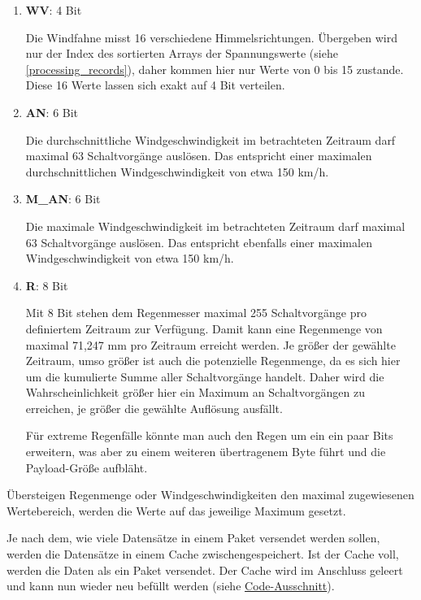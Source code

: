 \documentclass[12pt]{article}
\begin{document}
      \begin{enumerate}
        \item \textbf{WV}: 4 Bit
        
        Die Windfahne misst 16 verschiedene Himmelsrichtungen.
        Übergeben wird nur der Index des sortierten Arrays der Spannungswerte (siehe \underline{\ref{processing_records}}), daher kommen hier nur Werte von 0 bis 15 zustande.
        Diese 16 Werte lassen sich exakt auf 4 Bit verteilen.

        \item \textbf{AN}: 6 Bit
        
        Die durchschnittliche Windgeschwindigkeit im betrachteten Zeitraum darf maximal 63 Schaltvorgänge auslösen.
        Das entspricht einer maximalen durchschnittlichen Windgeschwindigkeit von etwa 150 km/h.

        \item \textbf{M\_AN}: 6 Bit
        
        Die maximale Windgeschwindigkeit im betrachteten Zeitraum darf maximal 63 Schaltvorgänge auslösen.
        Das entspricht ebenfalls einer maximalen Windgeschwindigkeit von etwa 150 km/h.

        \item \textbf{R}: 8 Bit
        
        Mit 8 Bit stehen dem Regenmesser maximal 255 Schaltvorgänge pro definiertem Zeitraum zur Verfügung.
        Damit kann eine Regenmenge von maximal 71,247 mm pro Zeitraum erreicht werden.
        Je größer der gewählte Zeitraum, umso größer ist auch die potenzielle Regenmenge, da es sich hier um die kumulierte Summe aller Schaltvorgänge handelt.
        Daher wird die Wahrscheinlichkeit größer hier ein Maximum an Schaltvorgängen zu erreichen, je größer die gewählte Auflösung ausfällt.

        Für extreme Regenfälle könnte man auch den Regen um ein ein paar Bits erweitern, was aber zu einem weiteren übertragenem Byte führt
        und die Payload-Größe aufbläht.
  
      \end{enumerate}

      Übersteigen Regenmenge oder Windgeschwindigkeiten den maximal zugewiesenen Wertebereich, werden die Werte auf das jeweilige Maximum gesetzt.

      Je nach dem, wie viele Datensätze in einem Paket versendet werden sollen, werden die Datensätze in einem Cache zwischengespeichert.
      Ist der Cache voll, werden die Daten als ein Paket versendet.
      Der Cache wird im Anschluss geleert und kann nun wieder neu befüllt werden (siehe \href{https://github.com/HTWDD-RN/LoRaWAN-Wetterstation-SEN-15901/blob/21bf650ae923dba30d39e37641f77aa94702a314/src/lora_weather_station/lora_weather_station.ino#L160}{Code-Ausschnitt}).
\end{document}
